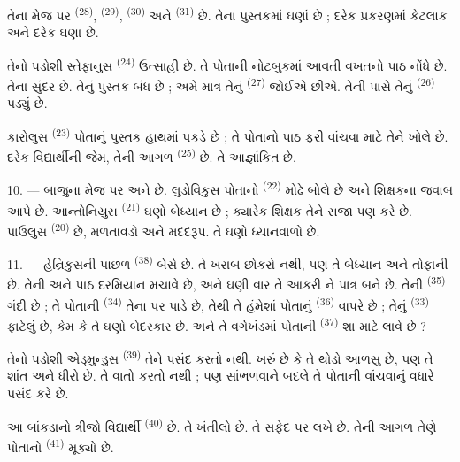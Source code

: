 તેના મેજ પર  \textsuperscript{(28)}, 
\textsuperscript{(29)},  \textsuperscript{(30)} અને
 \textsuperscript{(31)} છે. તેના પુસ્તકમાં ઘણાં
 છે ; દરેક પ્રકરણમાં કેટલાક  અને દરેક
 ઘણા  છે.

તેનો પડોશી સ્તેફાનુસ \textsuperscript{(24)} ઉત્સાહી છે. તે પોતાની
નોટબુકમાં આવતી વખતનો પાઠ નોંધે છે. તેના  સુંદર છે. તેનું
પુસ્તક બંધ છે ; અમે માત્ર તેનું  \textsuperscript{(27)}
જોઈએ છીએ. તેની પાસે તેનું  \textsuperscript{(26)} પડ્યું
છે.

કારોલુસ \textsuperscript{(23)} પોતાનું પુસ્તક હાથમાં પકડે છે ; તે
પોતાનો પાઠ ફરી વાંચવા માટે તેને ખોલે છે. દરેક વિદ્યાર્થીની જેમ, તેની
આગળ  \textsuperscript{(25)} છે. તે આજ્ઞાંકિત છે.

10. --- બાજુના મેજ પર   અને
 છે. લુડોવિકુસ પોતાનો  \textsuperscript{(22)}
મોઢે બોલે છે અને શિક્ષકના  જવાબ આપે છે.
આન્તોનિયુસ \textsuperscript{(21)} ઘણો બેધ્યાન છે ; ક્યારેક શિક્ષક તેને
સજા પણ કરે છે. પાઉલુસ \textsuperscript{(20)}  છે,
મળતાવડો અને મદદરૂપ. તે ઘણો ધ્યાનવાળો છે.

\VUsaut{4.2mm}
\VUsaut{3.2mm}

11. --- હેન્રિકુસની પાછળ  \textsuperscript{(38)}
બેસે છે. તે ખરાબ છોકરો નથી, પણ તે  બેધ્યાન અને
તોફાની છે. તેની  અને  પાઠ દરમિયાન
 મચાવે છે, અને ઘણી વાર તે આકરી ને પાત્ર
બને છે. તેની  \textsuperscript{(35)} ગંદી છે ; તે
પોતાની  \textsuperscript{(34)} તેના પર  પાડે છે, તેથી તે હંમેશાં પોતાનું 
\textsuperscript{(36)} વાપરે છે ; તેનું 
\textsuperscript{(33)} ફાટેલું છે, કેમ કે તે ઘણો બેદરકાર છે. અને તે
 વર્ગખંડમાં પોતાની 
\textsuperscript{(37)} શા માટે લાવે છે ?

તેનો પડોશી એડ્મુન્ડુસ \textsuperscript{(39)} તેને પસંદ કરતો નથી. ખરું
છે કે તે થોડો આળસુ છે, પણ તે શાંત અને ધીરો છે. તે વાતો કરતો નથી ; પણ
સાંભળવાને બદલે તે પોતાની   વાંચવાનું
વધારે પસંદ કરે છે.

આ બાંકડાનો ત્રીજો વિદ્યાર્થી  \textsuperscript{(40)}
છે. તે ખંતીલો છે. તે સફેદ  પર લખે છે. તેની આગળ તેણે
પોતાનો  \textsuperscript{(41)} મૂક્યો છે.

